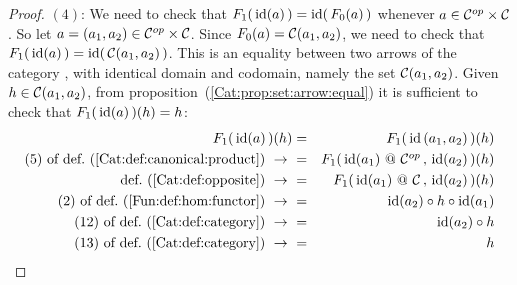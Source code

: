 \begin{proof}
    $(4)$: We need to check that $F_{1}(\,\mbox{\rm id}(a)\,)=\mbox{\rm id}(\,F_{0}(a)\,)$ whenever
    $a\in\mbox{${\cal C}^{op}$}\times\mbox{$\cal C$}$. So let $a=(a_{1},a_{2})\in\mbox{${\cal C}^{op}$}\times\mbox{$\cal C$}$. Since
    $F_{0}(a)=\mbox{$\cal C$}(a_{1},a_{2})$, we need to check that $F_{1}(\,\mbox{\rm id}(a)\,)
    =\mbox{\rm id}(\,\mbox{$\cal C$}(a_{1},a_{2})\,)$. This is an equality between two arrows
    of the category \Set, with identical domain and codomain, namely the set 
    $\mbox{$\cal C$}(a_{1},a_{2})$. Given $h\in\mbox{$\cal C$}(a_{1},a_{2})$, 
    from proposition~(\ref{Cat:prop:set:arrow:equal})
    it is sufficient to 
    check that $F_{1}(\,\mbox{\rm id}(a)\,)(h)=h$:
        \begin{eqnarray*}F_{1}(\,\id(a)\,)(h)
            &=&F_{1}(\,\id\,(a_{1},a_{2})\,)(h)\\
            \mbox{$(5)$ of def.~(\ref{Cat:def:canonical:product})}\ \to\ 
            &=&F_{1}(\,\id(a_{1})\ @\ \Cop\,,\,\id(a_{2})\,)(h)\\
            \mbox{def.~(\ref{Cat:def:opposite})}\ \to\ 
            &=&F_{1}(\,\id(a_{1})\ @\ \Cat\,,\,\id(a_{2})\,)(h)\\
            \mbox{$(2)$ of def.~(\ref{Fun:def:hom:functor})}\ \to\ 
            &=&\id(a_{2})\circ h\circ \id(a_{1})\\
            \mbox{$(12)$ of def.~(\ref{Cat:def:category})}\ \to\ 
            &=&\id(a_{2})\circ h\\
            \mbox{$(13)$ of def.~(\ref{Cat:def:category})}\ \to\ 
            &=&h
        \end{eqnarray*}


\end{proof}
